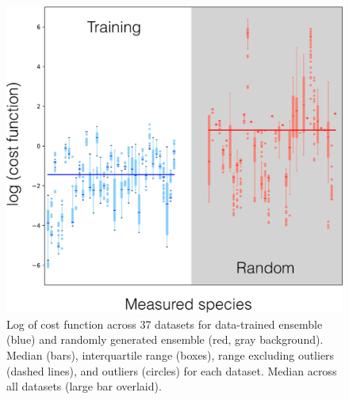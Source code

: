 \documentclass[12pt]{article}
\begin{document}
\begin{figure}[ht]
\centering
\includegraphics[width=1.00\textwidth]{./Figures/Fig_4_EnsembleVsRandom.pdf}
\caption{Log of cost function across 37 datasets for data-trained ensemble (blue) and randomly generated ensemble (red, gray background). Median (bars), interquartile range (boxes), range excluding outliers (dashed lines), and outliers (circles) for each dataset. Median across all datasets (large bar overlaid).}
\label{fig:BoxPlot}
\end{figure}
\end{document}
